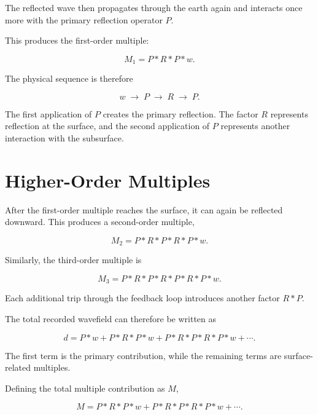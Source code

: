 \documentclass[11pt]{article}
\begin{document}
The reflected wave then propagates through the earth again and interacts once
more with the primary reflection operator $P$.

This produces the first-order multiple:

\begin{equation}
M_1 = P * R * P * w.
\end{equation}

The physical sequence is therefore

\begin{equation}
w
\;\longrightarrow\;
P
\;\longrightarrow\;
R
\;\longrightarrow\;
P.
\end{equation}

The first application of $P$ creates the primary reflection. The factor $R$
represents reflection at the surface, and the second application of $P$
represents another interaction with the subsurface.

\section{Higher-Order Multiples}

After the first-order multiple reaches the surface, it can again be reflected
downward. This produces a second-order multiple,

\begin{equation}
M_2 = P * R * P * R * P * w.
\end{equation}

Similarly, the third-order multiple is

\begin{equation}
M_3 = P * R * P * R * P * R * P * w.
\end{equation}

Each additional trip through the feedback loop introduces another factor
$R * P$.

The total recorded wavefield can therefore be written as

\begin{equation}
d =
P*w
+
P*R*P*w
+
P*R*P*R*P*w
+\cdots .
\end{equation}

The first term is the primary contribution, while the remaining terms are
surface-related multiples.

Defining the total multiple contribution as $M$,

\begin{equation}
M =
P*R*P*w
+
P*R*P*R*P*w
+\cdots .
\end{equation}
\end{document}
